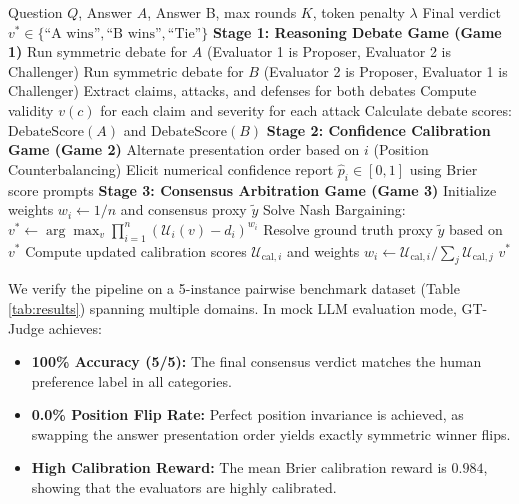 \documentclass[11pt,a4paper]{article}
\begin{document}
\begin{algorithm}[htbp]
\caption{GT-Judge Evaluation Pipeline}
\label{alg:gt_judge}
\begin{algorithmic}[1]
\REQUIRE Question $Q$, Answer $A$, Answer B, max rounds $K$, token penalty $\lambda$
\ENSURE Final verdict $v^* \in \{\text{``A wins''}, \text{``B wins''}, \text{``Tie''}\}$
\STATE \textbf{Stage 1: Reasoning Debate Game (Game 1)}
\STATE Run symmetric debate for $A$ (Evaluator 1 is Proposer, Evaluator 2 is Challenger)
\STATE Run symmetric debate for $B$ (Evaluator 2 is Proposer, Evaluator 1 is Challenger)
\STATE Extract claims, attacks, and defenses for both debates
\STATE Compute validity $v(c)$ for each claim and severity for each attack
\STATE Calculate debate scores: $\text{DebateScore}(A)$ and $\text{DebateScore}(B)$
\STATE \textbf{Stage 2: Confidence Calibration Game (Game 2)}
    \STATE Alternate presentation order based on $i$ (Position Counterbalancing)
    \STATE Elicit numerical confidence report $\hat{p}_i \in [0, 1]$ using Brier score prompts
\ENDFOR
\STATE \textbf{Stage 3: Consensus Arbitration Game (Game 3)}
\STATE Initialize weights $w_i \leftarrow 1/n$ and consensus proxy $\tilde{y}$
\REPEAT
    \STATE Solve Nash Bargaining: $v^* \leftarrow \arg\max_{v} \prod_{i=1}^n \left( \mathcal{U}_i(v) - d_i \right)^{w_i}$
    \STATE Resolve ground truth proxy $\tilde{y}$ based on $v^*$
    \STATE Compute updated calibration scores $\mathcal{U}_{\text{cal}, i}$ and weights $w_i \leftarrow \mathcal{U}_{\text{cal}, i} / \sum_j \mathcal{U}_{\text{cal}, j}$
\RETURN $v^*$
\end{algorithmic}
\end{algorithm}

We verify the pipeline on a 5-instance pairwise benchmark dataset (Table \ref{tab:results}) spanning multiple domains. In mock LLM evaluation mode, GT-Judge achieves:
\begin{itemize}
    \item \textbf{100\% Accuracy (5/5):} The final consensus verdict matches the human preference label in all categories.
    \item \textbf{0.0\% Position Flip Rate:} Perfect position invariance is achieved, as swapping the answer presentation order yields exactly symmetric winner flips.
    \item \textbf{High Calibration Reward:} The mean Brier calibration reward is $0.984$, showing that the evaluators are highly calibrated.
\end{itemize}
\end{document}
